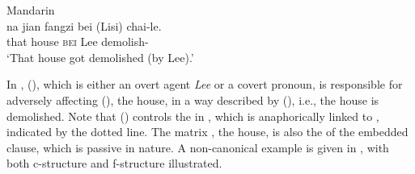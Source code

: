 \documentclass[output=paper,chinesefont,hidelinks]{langscibook}
\begin{document}
\ea%
    \label{ex:Sinitic:35}Mandarin\\
    \gll  na  jian  fangzi  bei  (Lisi)  chai-le.\\
         that   {\CLF}   house  \textsc{bei}  {\db}Lee   demolish-{\PFV}\\
         \glt `That house got demolished (by Lee).'\\[1ex]
    \z

  In , (\UP\OBJ), which is either an overt agent \textit{Lee} or a covert pronoun, is responsible for adversely affecting (\UP\SUBJ), the house, in a way described by \mbox{(\UP\XCOMP)}, i.e., the house is demolished. Note that (\UP\SUBJ) controls the {\TOPIC} in \XCOMP, which is anaphorically linked to {\SUBJ}, indicated by the dotted line. The matrix {\SUBJ}, the house, is also the {\SUBJ} of the embedded clause, which is passive in nature. A non-canonical example is given in , with both c-structure and f-structure illustrated.
\end{document}
